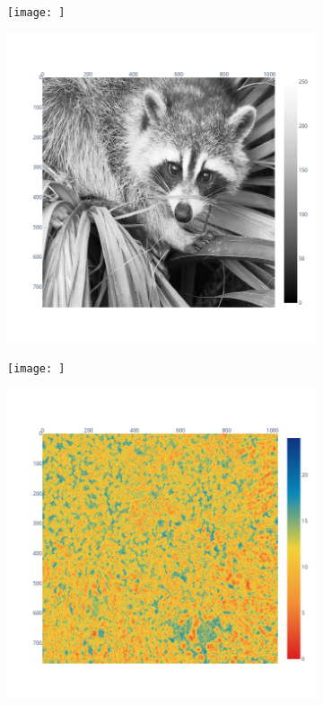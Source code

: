 \documentclass[11pt]{article}
\begin{document}
\begin{figure}
\centering
\begin{subfigure}{.3\linewidth}
    \texttt{[image: ]}
\end{subfigure}
\begin{subfigure}{.3\linewidth}
    \includegraphics[width=\linewidth]{figure/bspline/original_image.png}
    \caption{}
    \label{fig:bspline_input}
\end{subfigure}
\begin{subfigure}{.3\linewidth}
    \texttt{[image: ]}
\end{subfigure}
\begin{subfigure}{0.3\linewidth}
    \includegraphics[width=\linewidth]{figure/bspline/bisplev_ret_sig_portland_r.png}

\end{subfigure}
\end{figure}
\end{document}
